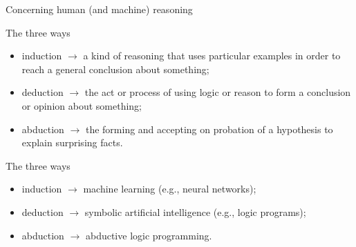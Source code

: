 \documentclass[presentation]{beamer}\mode<presentation>{\usetheme{AMSBolognaFC}}
\begin{document}
\begin{frame}[allowframebreaks]{Concerning human (and machine) reasoning}
    
    \begin{block}{The three ways}
        \begin{itemize}
            \item \alert{induction} $\rightarrow$ a kind of reasoning that uses particular examples in order to reach a general conclusion about something;
            \item \alert{deduction} $\rightarrow$ the act or process of using logic or reason to form a conclusion or opinion about something;
            \item \alert{abduction} $\rightarrow$ the forming and accepting on probation of a hypothesis to explain surprising facts.
        \end{itemize}
    \end{block}

    \framebreak
    
     \begin{block}{The three ways}
        \begin{itemize}
            \item \alert{induction} $\rightarrow$ machine learning (e.g., neural networks);
            \item \alert{deduction} $\rightarrow$ symbolic artificial intelligence (e.g., logic programs);
            \item \alert{abduction} $\rightarrow$ abductive logic programming.
        \end{itemize}
    \end{block}

\end{frame}
\end{document}
